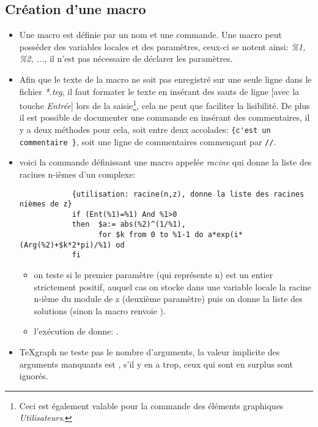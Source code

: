 \subsection{Création d'une macro}

\begin{itemize}
\item Une macro est définie par un nom et une commande. Une macro peut posséder des variables locales et des paramètres, ceux-ci se notent ainsi: \textsl{\%1, \%2, ...}, il n'est pas nécessaire de déclarer les paramètres. 

\item Afin que le texte de la macro ne soit pas enregistré sur une seule ligne dans le fichier \textit{ *.teg}, il faut formater le texte en insérant des sauts de ligne [avec la touche \textsl{Entrée}] lors de la saisie\footnote{Ceci est également valable pour la commande des éléments graphiques \textsl{Utilisateurs}.}, cela ne peut que faciliter la lisibilité. De plus il est possible de documenter une commande en insérant des commentaires, il y a deux méthodes pour cela, soit entre deux accolades: \verb|{c'est un commentaire }|, soit une ligne de commentaires commençant par \verb|//|.

\item \exem voici la commande définissant une macro appelée \textsl{racine} qui donne la liste des racines n-ièmes d'un complexe:

\begin{verbatim}
            {utilisation: racine(n,z), donne la liste des racines nièmes de z}
            if (Ent(%1)=%1) And %1>0
            then  $a:= abs(%2)^(1/%1), 
                  for $k from 0 to %1-1 do a*exp(i*(Arg(%2)+$k*2*pi)/%1) od
            fi
\end{verbatim}

    \begin{itemize}
    \item on teste si le premier paramètre (qui représente n) est un entier strictement positif, auquel cas on stocke dans une variable locale la racine n-ième du module de z (deuxième paramètre) puis on donne la liste des solutions (sinon la macro renvoie \Nil).
    \item l'exécution de \co{[\$a:=3, racine(a,i)]} donne: \res{[0.866025+0.5*i, -0.866025+0.5*i, -i]}.
    \end{itemize}

\item TeXgraph ne teste pas le nombre d'arguments, la valeur implicite des arguments manquants est \Nil, s'il y en a trop, ceux qui sont en surplus sont ignorés.
\end{itemize}


